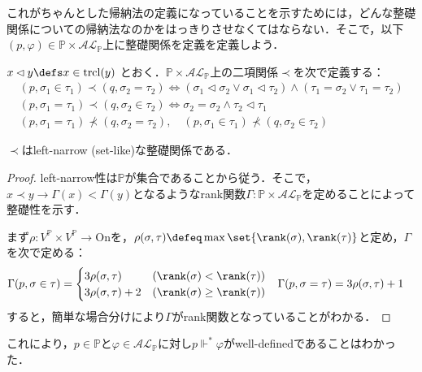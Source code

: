\documentclass[a4j]{bxjsarticle}
\theoremstyle{definition}
\begin{document}
これがちゃんとした帰納法の定義になっていることを示すためには，どんな整礎関係についての帰納法なのかをはっきりさせなくてはならない．そこで，以下$(p, \varphi) \in \mathbb{P} \times \mathcal{AL}_\mathbb{P}$上に整礎関係を定義を定義しよう．

\begin{definition}
 $x \lhd y \defs x \in \mathrm{trcl}(y)$ とおく．$\mathbb{P} \times \mathcal{AL}_\mathbb{P}$上の二項関係$\prec$を次で定義する：
 \begin{gather*}
  (p, \sigma_1 \in \tau_1) \prec (q, \sigma_2 = \tau_2) \Leftrightarrow (\sigma_1 \lhd \sigma_2 \vee \sigma_1 \lhd \tau_2) \wedge (\tau_1 = \sigma_2 \vee \tau_1 = \tau_2)\\
  (p, \sigma_1 = \tau_1) \prec (q, \sigma_2 \in \tau_2) \Leftrightarrow \sigma_2 = \sigma_2 \wedge \tau_2 \lhd \tau_1\\
  (p, \sigma_1 = \tau_1) \not\prec (q, \sigma_2 = \tau_2), \quad
  (p, \sigma_1 \in \tau_1) \not\prec (q, \sigma_2 \in \tau_2) 
 \end{gather*}
\end{definition}

\begin{claim}
 $\prec$はleft-narrow (set-like)な整礎関係である．
\end{claim}
\begin{proof}
 left-narrow性は$\mathbb{P}$が集合であることから従う．そこで，$x \prec y \rightarrow \Gamma(x) < \Gamma(y)$となるようなrank関数$\Gamma : \mathbb{P} \times \mathcal{AL}_\mathbb{P}$を定めることによって整礎性を示す．

 まず$\rho: V^\mathbb{P}\times V^\mathbb{P}\rightarrow \mathrm{On}$を，$\rho(\sigma, \tau) \defeq  \max\set{\rank(\sigma),\rank(\tau)}$と定め，$\Gamma$を次で定める：
 \begin{align*}
  \Gamma(p, \sigma \in \tau) &= \begin{cases}
				 3 \rho(\sigma, \tau) & (\rank(\sigma) < \rank(\tau))\\
				 3 \rho(\sigma, \tau) + 2 & (\rank(\sigma) \geq \rank(\tau))				 
				\end{cases} &
  \Gamma(p, \sigma = \tau) &= 3 \rho(\sigma, \tau) + 1
 \end{align*}
 すると，簡単な場合分けにより$\Gamma$がrank関数となっていることがわかる．\mbox{}
\end{proof}

これにより，$p \in \mathbb{P}$と$\varphi \in \mathcal{AL}_\mathbb{P}$に対し$p \mathrel{\Vdash^*} \varphi$がwell-definedであることはわかった．
\end{document}
